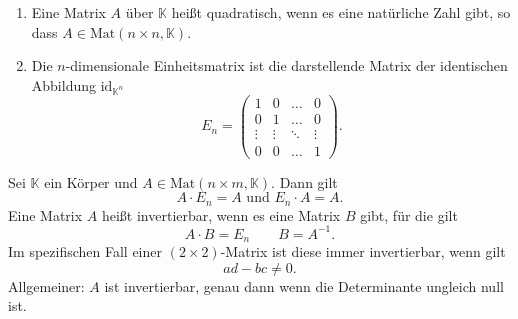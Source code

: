 \documentclass[a4paper,12pt]{article}
\begin{document}
\begin{enumerate}[label=(\alph*)]
        \item Eine Matrix $A$ über $\mathbb{K}$ heißt quadratisch, wenn es eine natürliche Zahl gibt, so dass $A \in \text{Mat}\left(n\times n,\mathbb{K}\right)$.
        \item Die $n$-dimensionale Einheitsmatrix ist die darstellende Matrix der identischen Abbildung $\text{id}_{\mathbb{K}^{n}}$
                \[ 
                        E_n=\left(\begin{matrix}
                                        1&0&\hdots &0\\
                                        0&1&\hdots &0\\
                                        \vdots&\vdots&\ddots&\vdots\\
                                        0&0&\hdots &1
                        \end{matrix}\right)
                .\] 
\end{enumerate}
Sei $\mathbb{K}$ ein Körper und $A \in \text{Mat}\left(n\times m,\mathbb{K}\right)$. Dann gilt
\[ 
        A\cdot E_n=A\text{ und }E_n\cdot A=A
.\] 
Eine Matrix $A$ heißt invertierbar, wenn es eine Matrix $B$ gibt, für die gilt
\[ 
        A\cdot B=E_n\qquad B=A^{-1}
.\] 
Im spezifischen Fall einer $\left(2\times2\right)$-Matrix ist diese immer invertierbar, wenn gilt
\[ 
        ad-bc\neq 0
.\] 
Allgemeiner: $A$ ist invertierbar, genau dann wenn die Determinante ungleich null ist.
\end{document}
